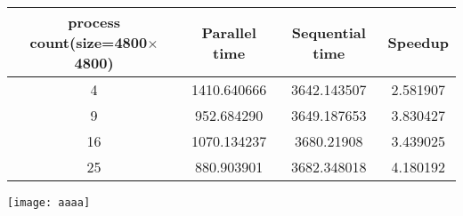 \begin{center}
	\begin{tabular}{ |c|c|c|c| } 
		\hline
		process count(size=4800$\times$4800) & Parallel time & Sequential time & Speedup\\ \hline
		4 & 1410.640666 & 3642.143507 & 2.581907 \\ 
		9 & 952.684290 & 3649.187653 &  3.830427\\ 
		16 & 1070.134237 & 3680.21908 & 3.439025 \\ 
		25 & 880.903901 & 3682.348018 & 4.180192
		 \\ 
		
		\hline
	\end{tabular}
	
\end{center}

\texttt{[image: aaaa]} \\

